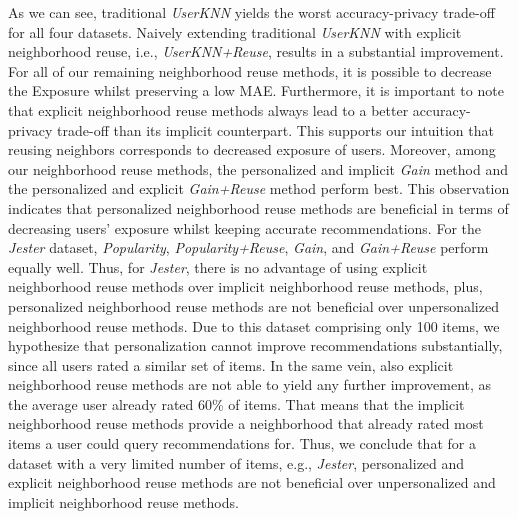 \documentclass[manuscript,review,anonymous]{acmart}
\begin{document}
As we can see, traditional \emph{UserKNN} yields the worst accuracy-privacy trade-off for all four datasets.
Naively extending traditional \emph{UserKNN} with explicit neighborhood reuse, i.e., \emph{UserKNN+Reuse}, results in a substantial improvement.
For all of our remaining neighborhood reuse methods, it is possible to decrease the Exposure whilst preserving a low MAE.
Furthermore, it is important to note that explicit neighborhood reuse methods always lead to a better accuracy-privacy trade-off than its implicit counterpart.
This supports our intuition that reusing neighbors corresponds to decreased exposure of users.
Moreover, among our neighborhood reuse methods, the personalized and implicit \emph{Gain} method and the personalized and explicit \emph{Gain+Reuse} method perform best.
This observation indicates that personalized neighborhood reuse methods are beneficial in terms of decreasing users' exposure whilst keeping accurate recommendations.
For the \emph{Jester} dataset, \emph{Popularity}, \emph{Popularity+Reuse}, \emph{Gain}, and \emph{Gain+Reuse} perform equally well.
Thus, for \emph{Jester}, there is no advantage of using explicit neighborhood reuse methods over implicit neighborhood reuse methods, plus, personalized neighborhood reuse methods are not beneficial over unpersonalized neighborhood reuse methods.
Due to this dataset comprising only 100 items, we hypothesize that personalization cannot improve recommendations substantially, since all users rated a similar set of items.
In the same vein, also explicit neighborhood reuse methods are not able to yield any further improvement, as the average user already rated 60\% of items. 
That means that the implicit neighborhood reuse methods provide a neighborhood that already rated most items a user could query recommendations for.
Thus, we conclude that for a dataset with a very limited number of items, e.g., \emph{Jester}, personalized and explicit neighborhood reuse methods are not beneficial over unpersonalized and implicit neighborhood reuse methods.
\end{document}
